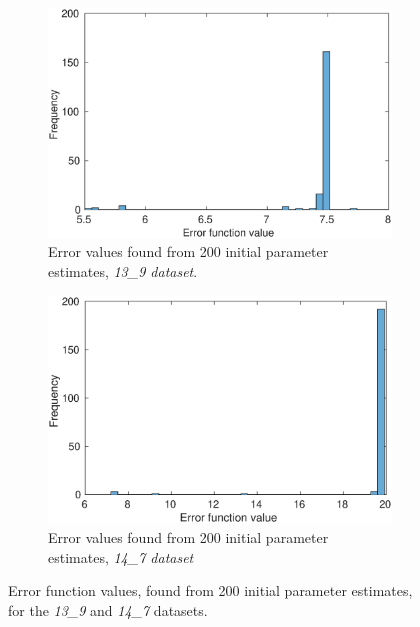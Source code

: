 \documentclass[10pt,journal]{./IEEE_latex_class/IEEEtran}
\begin{document}
\begin{figure}[H]
    
       \begin{subfigure}[c]{0.49\textwidth}
        \centering
    \includegraphics[scale = 0.35, clip = true, trim = 0 0 0 0]{13_9_f_hist}
        \caption{Error values found from 200 initial parameter estimates, \textit{13\_9 dataset}. }
        \label{InitialResults_13_9_f}
    \end{subfigure}
    \begin{subfigure}[c]{0.49\textwidth}
    \centering
        \includegraphics[scale = 0.35, clip = true, trim = 0 0 0 0]{14_7_f_hist}
        \caption{Error values found from 200 initial parameter estimates, \textit{14\_7 dataset}}
        \label{InitialResults_14_7_f}
    \end{subfigure}
    \caption{Error function values, found from 200 initial parameter estimates, for the \textit{13\_9} and \textit{14\_7} datasets.}     
\label{InitialResults_additional}
\end{figure}
\end{document}
